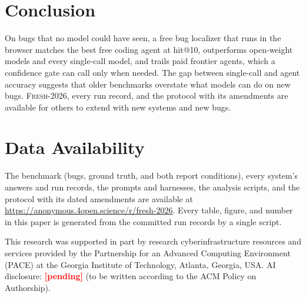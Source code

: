 \documentclass[acmsmall,screen,review,anonymous]{acmart}
\newcommand{\artifact}{\url{https://anonymous.4open.science/r/fresh-2026}}
\newcommand{\artifact}{\url{https://github.com/Lazeeez/Allfather}}
\newcommand{\fresh}{\textsc{Fresh-2026}\xspace}
\newcommand{\pending}{\textbf{\textcolor{red}{[pending]}}}
\begin{document}
\section{Conclusion}
\label{sec:conclusion}

On \NBugs{} bugs that no model could have seen, a free bug localizer that runs in the browser matches the best free coding agent at hit@10, outperforms open-weight models and every single-call model, and trails paid frontier agents, which a confidence gate can call only when needed. The gap between single-call and agent accuracy suggests that older benchmarks overstate what models can do on new bugs. \fresh, every run record, and the protocol with its amendments are available for others to extend with new systems and new bugs.

\section*{Data Availability}

The benchmark (bugs, ground truth, and both report conditions), every system's answers and run records, the prompts and harnesses, the analysis scripts, and the protocol with its dated amendments are available at \artifact. Every table, figure, and number in this paper is generated from the committed run records by a single script.

\begin{acks}
This research was supported in part by research cyberinfrastructure resources and services provided by the Partnership for an Advanced Computing Environment (PACE) at the Georgia Institute of Technology, Atlanta, Georgia, USA. AI disclosure: \pending{} (to be written according to the ACM Policy on Authorship).
\end{acks}



\end{document}

